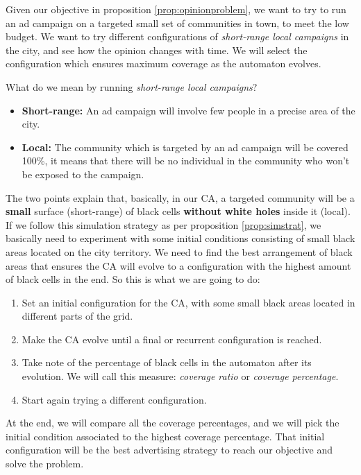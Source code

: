 \begin{proposition}
\label{prop:simstrat}
Given our objective in proposition \ref{prop:opinionproblem}, we want to try to run an ad
campaign on a targeted small set of communities in town, to meet the low budget. We want to try
different configurations of \textit{short-range local campaigns} in the city,
and see how the opinion changes with time. We will select the configuration which ensures
maximum coverage as the automaton evolves.
\end{proposition}

What do we mean by running \textit{short-range local campaigns}?

\begin{itemize}
\item \textbf{Short-range:} An ad campaign will involve few people in a precise area of the city.
\item \textbf{Local:} The community which is targeted by an ad campaign will be covered 100\%, it
means that there will be no individual in the community who won't be exposed to the campaign.
\end{itemize}

The two points explain that, basically, in our CA,
a targeted community will be a \textbf{small} surface (short-range) of black cells
\textbf{without white holes} inside it (local). If we follow this simulation strategy as per proposition
\ref{prop:simstrat}, we basically need to experiment with some initial conditions consisting of small
black areas located on the city territory. We need to find the best arrangement of black areas that
ensures the CA will evolve to a configuration with the highest amount of black cells in the end.
So this is what we are going to do:

\begin{enumerate}
\item Set an initial configuration for the CA, with some small black areas located in
different parts of the grid.
\item Make the CA evolve until a final or recurrent configuration is reached.
\item Take note of the percentage of black cells in the automaton after its evolution. We will call this
measure: \textit{coverage ratio} or \textit{coverage percentage}.
\item Start again trying a different configuration.
\end{enumerate}

At the end, we will compare all the coverage percentages, and we will pick the initial condition
associated to the highest coverage percentage. That initial configuration will be the best
advertising strategy to reach our objective and solve the problem.

